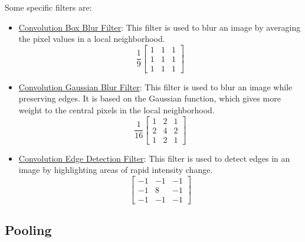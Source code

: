 Some specific filters are:
\begin{itemize}
    \item \ul{Convolution Box Blur Filter}: This filter is used to blur an image by averaging the pixel values in a local neighborhood.
    \begin{equation*}
        \frac{1}{9}\begin{bmatrix}
            1 & 1 & 1 \\
            1 & 1 & 1 \\
            1 & 1 & 1
        \end{bmatrix}
    \end{equation*}

    \item \ul{Convolution Gaussian Blur Filter}: This filter is used to blur an image while preserving edges. It is based on the Gaussian function, which gives more weight to the central pixels in the local neighborhood.
    \begin{equation*}
        \frac{1}{16}\begin{bmatrix}
            1 & 2 & 1 \\
            2 & 4 & 2 \\
            1 & 2 & 1
        \end{bmatrix}
    \end{equation*}
    \item \ul{Convolution Edge Detection Filter}: This filter is used to detect edges in an image by highlighting areas of rapid intensity change.
    \begin{equation*}
        \begin{bmatrix}
            -1 & -1 & -1 \\
            -1 & 8 & -1 \\
            -1 & -1 & -1
        \end{bmatrix}
    \end{equation*}
\end{itemize}

\subsection{Pooling}


